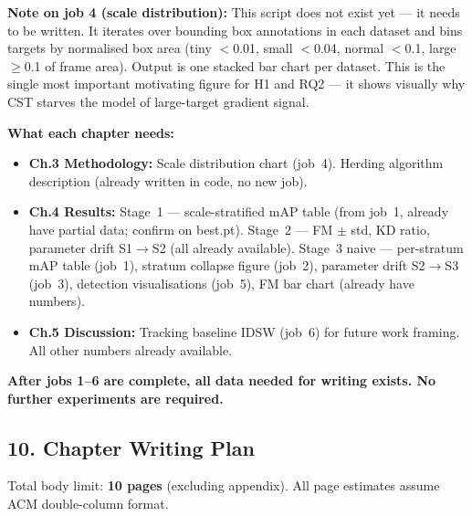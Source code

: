\noindent \textbf{Note on job 4 (scale distribution):}
This script does not exist yet — it needs to be written. It iterates
over bounding box annotations in each dataset and bins targets by
normalised box area (tiny $<$0.01, small $<$0.04, normal $<$0.1,
large $\geq$0.1 of frame area). Output is one stacked bar chart per
dataset. This is the single most important motivating figure for H1
and RQ2 — it shows visually why CST starves the model of large-target
gradient signal.

\vspace{0.5em}
\noindent \textbf{What each chapter needs:}

\begin{itemize}
    \item \textbf{Ch.3 Methodology:} Scale distribution chart (job~4).
    Herding algorithm description (already written in code, no new job).
    \item \textbf{Ch.4 Results:}
        Stage~1 — scale-stratified mAP table (from job~1, already have
        partial data; confirm on best.pt).
        Stage~2 — FM $\pm$ std, KD ratio, parameter drift S1$\to$S2
        (all already available).
        Stage~3 naive — per-stratum mAP table (job~1), stratum collapse
        figure (job~2), parameter drift S2$\to$S3 (job~3),
        detection visualisations (job~5), FM bar chart (already have numbers).
    \item \textbf{Ch.5 Discussion:} Tracking baseline IDSW (job~6)
    for future work framing. All other numbers already available.
\end{itemize}

\noindent \textbf{After jobs 1--6 are complete, all data needed for
writing exists. No further experiments are required.}

\subsection*{10. Chapter Writing Plan}

\noindent Total body limit: \textbf{10 pages} (excluding appendix).
All page estimates assume ACM double-column format.

